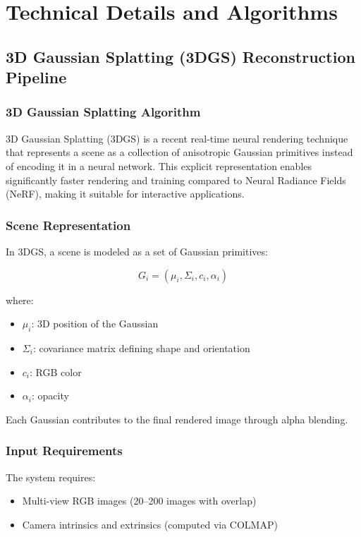 \section{Technical Details and Algorithms}

\subsection{3D Gaussian Splatting (3DGS) Reconstruction Pipeline}

\subsubsection{3D Gaussian Splatting Algorithm}

3D Gaussian Splatting (3DGS) is a recent real-time neural rendering technique that represents a scene as a collection of anisotropic Gaussian primitives instead of encoding it in a neural network. This explicit representation enables significantly faster rendering and training compared to Neural Radiance Fields (NeRF), making it suitable for interactive applications.

\subsubsection*{Scene Representation}

In 3DGS, a scene is modeled as a set of Gaussian primitives:

\[
G_i = (\mu_i, \Sigma_i, c_i, \alpha_i)
\]

where:
\begin{itemize}
    \item $\mu_i$: 3D position of the Gaussian
    \item $\Sigma_i$: covariance matrix defining shape and orientation
    \item $c_i$: RGB color
    \item $\alpha_i$: opacity
\end{itemize}

Each Gaussian contributes to the final rendered image through alpha blending.

\subsubsection*{Input Requirements}

The system requires:
\begin{itemize}
    \item Multi-view RGB images (20–200 images with overlap)
    \item Camera intrinsics and extrinsics (computed via COLMAP)
\end{itemize}

